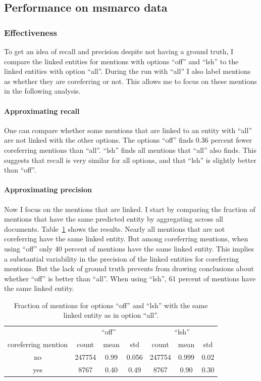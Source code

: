 \documentclass[a4paper,11pt]{article}
\numberwithin{equation}{section} %
\begin{document}
\subsection{Performance on msmarco data}

\subsubsection{Effectiveness}

To get an idea of recall and precision despite not having a ground truth, I compare the linked entities for mentions with options ``off'' and ``lsh'' to the linked entities with option ``all''. 
During the run with ``all'' I also label mentions as whether they are coreferring or not. This allows me to focus on these mentions in the following analysis.


\paragraph{Approximating recall}
One can compare whether some mentions that are linked to an entity with ``all'' are not linked with the other options. 
The options ``off'' finds 0.36 percent fewer coreferring mentions than ``all''. ``lsh'' finds all mentions that ``all'' also finds. 
This suggests that recall is very similar for all options, and that ``lsh'' is slightly better than ``off''. 


\paragraph{Approximating precision}
Now I focus on the mentions that are linked. I start by comparing the fraction of mentions that have the same predicted entity by aggregating across all documents. Table~\ref{tab:performance_msmarco_avg} shows the results.
Nearly all mentions that are not coreferring have the same linked entity. 
But among coreferring mentions, when using ``off'' only 40 percent of mentions have the same linked entity. 
This implies a substantial variability in the precision of the linked entities for coreferring mentions. But the lack of ground truth prevents from drawing conclusions about whether ``off'' is better than ``all''. 
When using ``lsh'', 61 percent of mentions have the same linked entity.

\begin{table}
 \begin{tabular}{c c c c c c c}
 \hline
    & \multicolumn{3}{c}{``off''} & \multicolumn{3}{c}{``lsh''} \\
   coreferring mention & count & mean & std & count & mean & std \\
 \hline 
 no & 247754 & 0.99 & 0.056 & 247754 &	0.999 &	0.02 \\  
 yes & 8767 & 0.40 & 0.49 & 8767 & 0.90   &	0.30	 \\ 
\hline 
\end{tabular}
\caption{Fraction of mentions for options ``off'' and ``lsh'' with the same linked entity as in option ``all''.}
\label{tab:performance_msmarco_avg}
\end{table}
\end{document}
